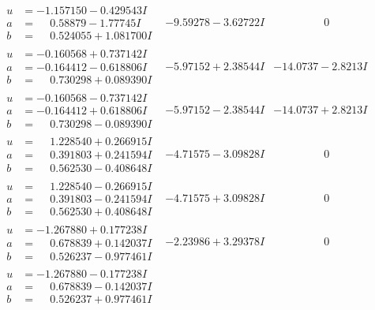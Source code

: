 \documentclass[1p]{elsarticle_modified}
\theoremstyle{definition}
\begin{document}
$$\begin{array}{c|c|c}
\begin{aligned}
u &= -1.157150 - 0.429543 I \\
a &= \phantom{-}0.58879 - 1.77745 I \\
b &= \phantom{-}0.524055 + 1.081700 I\end{aligned}
 & -9.59278 - 3.62722 I & \phantom{-0.000000 } 0 \\ \hline\begin{aligned}
u &= -0.160568 + 0.737142 I \\
a &= -0.164412 - 0.618806 I \\
b &= \phantom{-}0.730298 + 0.089390 I\end{aligned}
 & -5.97152 + 2.38544 I & -14.0737 - 2.8213 I \\ \hline\begin{aligned}
u &= -0.160568 - 0.737142 I \\
a &= -0.164412 + 0.618806 I \\
b &= \phantom{-}0.730298 - 0.089390 I\end{aligned}
 & -5.97152 - 2.38544 I & -14.0737 + 2.8213 I \\ \hline\begin{aligned}
u &= \phantom{-}1.228540 + 0.266915 I \\
a &= \phantom{-}0.391803 + 0.241594 I \\
b &= \phantom{-}0.562530 - 0.408648 I\end{aligned}
 & -4.71575 - 3.09828 I & \phantom{-0.000000 } 0 \\ \hline\begin{aligned}
u &= \phantom{-}1.228540 - 0.266915 I \\
a &= \phantom{-}0.391803 - 0.241594 I \\
b &= \phantom{-}0.562530 + 0.408648 I\end{aligned}
 & -4.71575 + 3.09828 I & \phantom{-0.000000 } 0 \\ \hline\begin{aligned}
u &= -1.267880 + 0.177238 I \\
a &= \phantom{-}0.678839 + 0.142037 I \\
b &= \phantom{-}0.526237 - 0.977461 I\end{aligned}
 & -2.23986 + 3.29378 I & \phantom{-0.000000 } 0 \\ \hline\begin{aligned}
u &= -1.267880 - 0.177238 I \\
a &= \phantom{-}0.678839 - 0.142037 I \\
b &= \phantom{-}0.526237 + 0.977461 I\end{aligned}

\end{array}$$
\end{document}
